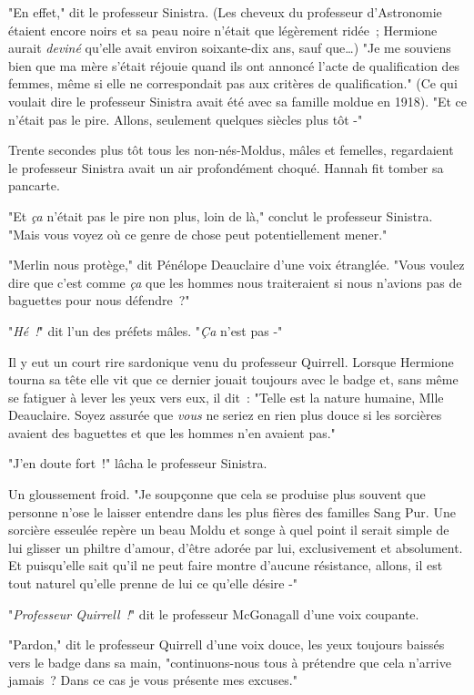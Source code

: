 "En effet," dit le professeur Sinistra. (Les cheveux du professeur d'Astronomie étaient encore noirs et sa peau noire n'était que légèrement ridée~; Hermione aurait \emph{deviné} qu'elle avait environ soixante-dix ans, sauf que…) "Je me souviens bien que ma mère s'était réjouie quand ils ont annoncé l'acte de qualification des femmes, même si elle ne correspondait pas aux critères de qualification." (Ce qui voulait dire le professeur Sinistra avait été avec sa famille moldue en 1918). "Et ce n'était pas le pire. Allons, seulement quelques siècles plus tôt -"

Trente secondes plus tôt tous les non-nés-Moldus, mâles et femelles, regardaient le professeur Sinistra avait un air profondément choqué. Hannah fit tomber sa pancarte.

"Et \emph{ça} n'était pas le pire non plus, loin de là," conclut le professeur Sinistra. "Mais vous voyez où ce genre de chose peut potentiellement mener."

"Merlin nous protège," dit Pénélope Deauclaire d'une voix étranglée. "Vous voulez dire que c'est comme \emph{ça} que les hommes nous traiteraient si nous n'avions pas de baguettes pour nous défendre~?"

"\emph{Hé~!}" dit l'un des préfets mâles. "\emph{Ça} n'est pas -"

Il y eut un court rire sardonique venu du professeur Quirrell. Lorsque Hermione tourna sa tête elle vit que ce dernier jouait toujours avec le badge et, sans même se fatiguer à lever les yeux vers eux, il dit~: "Telle est la nature humaine, Mlle Deauclaire. Soyez assurée que \emph{vous} ne seriez en rien plus douce si les sorcières avaient des baguettes et que les hommes n'en avaient pas."

"J'en doute fort~!" lâcha le professeur Sinistra.

Un gloussement froid. "Je soupçonne que cela se produise plus souvent que personne n'ose le laisser entendre dans les plus fières des familles Sang Pur. Une sorcière esseulée repère un beau Moldu et songe à quel point il serait simple de lui glisser un philtre d'amour, d'être adorée par lui, exclusivement et absolument. Et puisqu'elle sait qu'il ne peut faire montre d'aucune résistance, allons, il est tout naturel qu'elle prenne de lui ce qu'elle désire -"

"\emph{Professeur Quirrell~!}" dit le professeur McGonagall d'une voix coupante.

"Pardon," dit le professeur Quirrell d'une voix douce, les yeux toujours baissés vers le badge dans sa main, "continuons-nous tous à prétendre que cela n'arrive jamais~? Dans ce cas je vous présente mes excuses."

